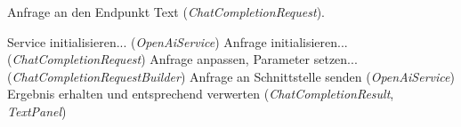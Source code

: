 \begin{algorithm}[htb]
\caption{Anfrage an den Endpunkt Text (\textit{ChatCompletionRequest}).}
\label{sec3:model:subsubsec:genai-integration:alg:text-end}
\begin{algorithmic}[1]
  \State Service initialisieren... (\textit{OpenAiService})
  \State Anfrage initialisieren... (\textit{ChatCompletionRequest})
  \State Anfrage anpassen, Parameter setzen... (\textit{ChatCompletionRequestBuilder})
  \State Anfrage an Schnittstelle senden (\textit{OpenAiService})
  \State Ergebnis erhalten und entsprechend verwerten (\textit{ChatCompletionResult}, \textit{TextPanel})
\EndProcedure
\end{algorithmic}
\end{algorithm}
